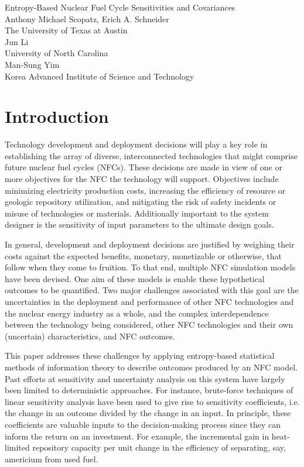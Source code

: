 \documentclass[a4paper, 12pt]{article}
\begin{document}
\begin{center}
Entropy-Based Nuclear Fuel Cycle Sensitivities and Covariances\\
\vspace{10mm}
Anthony Michael Scopatz, Erich A. Schneider\\
The University of Texas at Austin\\
\vspace{2mm}
Jun Li\\
University of North Carolina\\
\vspace{2mm}
Man-Sung Yim\\
Korea Advanced Institute of Science and Technology\\
\end{center}
\vspace{5mm}

\section{Introduction}
\label{sec:intro}

Technology development and deployment decisions will play a key role in
establishing the array of diverse, interconnected technologies that might comprise
future nuclear fuel cycles (NFCs).  These decisions are made in view of one or more
objectives for the NFC the technology will support.  Objectives include minimizing
electricity production costs, increasing the efficiency of resource or geologic
repository utilization, and mitigating the risk of safety incidents or misuse of
technologies or materials.  Additionally important to the system designer is the sensitivity 
of input parameters to the ultimate design goals.  

In general, development and deployment decisions are justified by weighing their costs 
against the expected benefits, monetary, monetizable or otherwise, that follow when they 
come to fruition.  To that end, multiple NFC simulation models  \cite{Jacobson2009} \cite{GENIUS1} 
have been devised.  One aim of these models is enable these hypothetical outcomes to be quantified.  
Two major challenges associated with this goal are the uncertainties in the deployment and performance 
of other NFC technologies and the nuclear energy industry as a whole, and the complex 
interdependence between the technology being considered, other NFC technologies and their 
own (uncertain) characteristics, and NFC outcomes.

This paper addresses these challenges by applying entropy-based statistical methods of information
theory to describe outcomes produced by an NFC model.  Past efforts at sensitivity and uncertainty
analysis on this system have largely been limited to deterministic approaches.  For instance,
brute-force techniques of linear sensitivity analysis have been used to give rise to sensitivity
coefficients, i.e. the change in an outcome divided by the change in an input.  In principle, these
coefficients are valuable inputs to the decision-making process since they can inform the
return on an investment.  For example, the incremental gain in heat-limited repository capacity per
unit change in the efficiency of separating, say, americium from used fuel.
\end{document}
